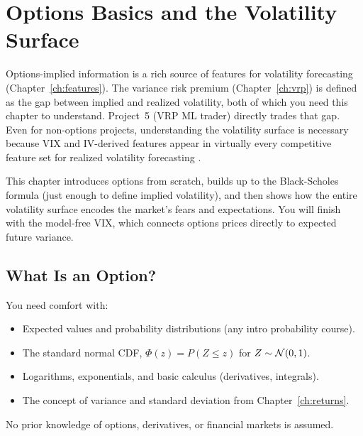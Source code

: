\chapter{Options Basics and the Volatility Surface}
\label{ch:volsurface}

\begin{application}
Options-implied information is a rich source of features for volatility forecasting (Chapter~\ref{ch:features}).
The variance risk premium (Chapter~\ref{ch:vrp}) is defined as the gap between implied and realized volatility, both of which you need this chapter to understand.
Project~5 (VRP ML trader) directly trades that gap.
Even for non-options projects, understanding the volatility surface is necessary because VIX and IV-derived features appear in virtually every competitive feature set for realized volatility forecasting \citep{Gu2020}.
\end{application}

This chapter introduces options from scratch, builds up to the Black-Scholes formula (just enough to define implied volatility), and then shows how the entire volatility surface encodes the market's fears and expectations.
You will finish with the model-free VIX, which connects options prices directly to expected future variance.

\section{What Is an Option?}
\label{sec:what-is-option}

\begin{prereq}
You need comfort with:
\begin{itemize}[nosep]
  \item Expected values and probability distributions (any intro probability course).
  \item The standard normal CDF, $\Phi(z) = P(Z \leq z)$ for $Z \sim \mathcal{N}(0,1)$.
  \item Logarithms, exponentials, and basic calculus (derivatives, integrals).
  \item The concept of variance and standard deviation from Chapter~\ref{ch:returns}.
\end{itemize}
No prior knowledge of options, derivatives, or financial markets is assumed.
\end{prereq}

